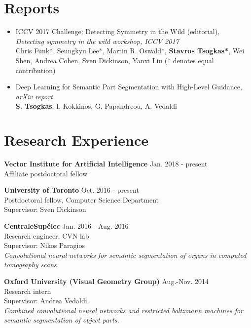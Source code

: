 \documentclass[margin]{res}
\begin{document}
\begin{resume}
\section{Reports}
	\begin{itemize}
		\item ICCV 2017 Challenge: Detecting Symmetry in the Wild (editorial), \\
		\emph{Detecting symmetry in the wild workshop, ICCV 2017}\\
		Chris Funk*, Seungkyu Lee*, Martin R. Oswald*, \textbf{Stavros Tsogkas*}, 
		Wei Shen, Andrea Cohen, Sven Dickinson, Yanxi Liu 
		(* denotes equal contribution)
		\item  Deep Learning for Semantic Part Segmentation with High-Level Guidance, \emph{arXiv report}\\
		\textbf{S. Tsogkas}, I. Kokkinos, G. Papandreou, A. Vedaldi 
  \end{itemize}

\section{Research Experience} 
\textbf{Vector Institute for Artificial Intelligence} \hfill Jan. 2018 - present\\
Affiliate postdoctoral fellow

\textbf{University of Toronto} \hfill Oct. 2016 - present\\
Postdoctoral fellow, Computer Science Department\\
Supervisor: Sven Dickinson

\textbf{CentraleSup\'elec} \hfill Jan. 2016 - Aug. 2016\\
Research engineer, CVN lab \\
Supervisor: Nikos Paragios \\
\emph{Convolutional neural networks for semantic 
	segmentation of organs in computed tomography scans.
}

\textbf{Oxford University (Visual Geometry Group)} \hfill Aug.-Nov. 2014\\
Research intern \\
Supervisor: Andrea Vedaldi. \\
\emph{Combined convolutional neural networks 
	and restricted boltzmann machines for semantic segmentation 
	of object parts.
}



\end{resume}
\end{document}

